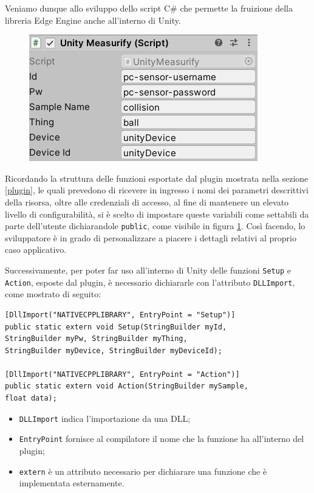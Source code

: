 Veniamo dunque allo sviluppo dello script C\# che permette la fruizione della libreria Edge Engine anche all'interno di Unity.  

\begin{figure}
	\centering
	\includegraphics[scale=0.85]{pics/unityscriptvars}
	\caption{}
	\label{unityscriptvars}
\end{figure}

Ricordando la struttura delle funzioni esportate dal plugin mostrata nella sezione \ref{plugin}, le quali prevedono di ricevere in ingresso i nomi dei parametri descrittivi della risorsa, oltre alle credenziali di accesso, al fine di mantenere un elevato livello di configurabilità, si è scelto di impostare queste variabili come settabili da parte dell'utente dichiarandole \texttt{public}, come visibile in figura \ref{unityscriptvars}. Così facendo, lo sviluppatore è in grado di personalizzare a piacere i dettagli relativi al proprio caso applicativo.

Successivamente, per poter far uso all'interno di Unity delle funzioni \texttt{Setup} e \texttt{Action}, esposte dal plugin, è necessario dichiararle con l’attributo \texttt{DLLImport}, come mostrato di seguito:

\begin{verbatim}
[DllImport("NATIVECPPLIBRARY", EntryPoint = "Setup")]
public static extern void Setup(StringBuilder myId, 
StringBuilder myPw, StringBuilder myThing, 
StringBuilder myDevice, StringBuilder myDeviceId);

[DllImport("NATIVECPPLIBRARY", EntryPoint = "Action")]
public static extern void Action(StringBuilder mySample, 
float data);
\end{verbatim}

\begin{itemize}
	\item \texttt{DLLImport} indica l'importazione da una DLL;
	\item \texttt{EntryPoint} fornisce al compilatore il nome che la funzione ha all'interno del plugin;
	\item \texttt{extern} è un attributo necessario per dichiarare una funzione che è implementata esternamente.
\end{itemize}

